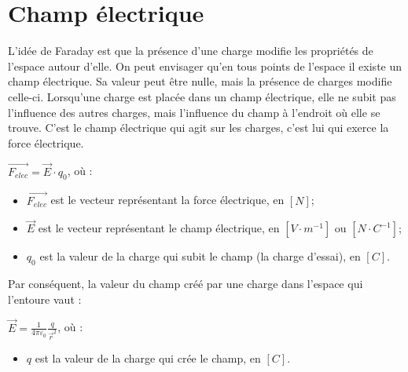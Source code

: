 \newpage

\section{Champ électrique}
L'idée de Faraday est que la présence d'une charge modifie les propriétés de l'espace autour d'elle. On peut envisager qu'en tous points de l'espace il existe un champ électrique. Sa valeur peut être nulle, mais la présence de charges modifie celle-ci.
Lorsqu'une charge est placée dans un champ électrique, elle ne subit pas l'influence des autres charges, mais l'influence du champ à l'endroit où elle se trouve. C'est le champ électrique qui agit sur les charges, c'est lui qui exerce la force électrique.

\begin{encadre}
    \(\vec{F_{elec}}=\vec{E} \cdot q_0\), où :
    \begin{itemize}[label=\textbullet]
        \item \(\vec{F_{elec}}\) est le vecteur représentant la force électrique, en \([N]\);
        \item \(\vec{E}\) est le vecteur représentant le champ électrique, en \([V \cdot m^{-1}]\) ou \([N \cdot C^{-1}]\);
        \item \(q_0\) est la valeur de la charge qui subit le champ (la charge d'essai), en \([C]\).
    \end{itemize}
\end{encadre}

Par conséquent, la valeur du champ créé par une charge dans l'espace qui l'entoure vaut :
\begin{encadre}
    \(\vec{E}=\frac{1}{4 \pi \varepsilon _0} \frac{q}{\vec{r}^2}\), où :
    \begin{itemize}[label=\textbullet]
        \item \(q\) est la valeur de la charge qui crée le champ, en \([C]\).
    \end{itemize}
\end{encadre}



\newpage



